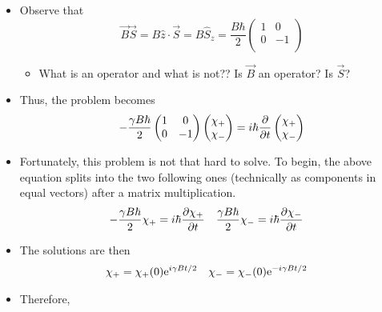 \documentclass[../notes.tex]{subfiles}
\begin{document}
\begin{itemize}
    \item Observe that
    \begin{equation*}
        \vec{B}\vec{S} = B\hat{z}\cdot\vec{S}
        = B\hat{S}_z
        = \frac{B\hbar}{2}
        \begin{pmatrix}
            1 & 0\\
            0 & -1\\
        \end{pmatrix}
    \end{equation*}
    \begin{itemize}
        \item What is an operator and what is not?? Is $\vec{B}$ an operator? Is $\vec{S}$?
    \end{itemize}
    \pagebreak
    \item Thus, the problem becomes
    \begin{equation*}
        -\frac{\gamma B\hbar}{2}
        \begin{pmatrix}
            1 & 0\\
            0 & -1\\
        \end{pmatrix}
        \begin{pmatrix}
            \chi_+\\
            \chi_-\\
        \end{pmatrix}
        = i\hbar\pdv{t}
        \begin{pmatrix}
            \chi_+\\
            \chi_-\\
        \end{pmatrix}
    \end{equation*}
    \item Fortunately, this problem is not that hard to solve. To begin, the above equation splits into the two following ones (technically as components in equal vectors) after a matrix multiplication.
    \begin{align*}
        -\frac{\gamma B\hbar}{2}\chi_+ &= i\hbar\pdv{\chi_+}{t}&
        \frac{\gamma B\hbar}{2}\chi_- &= i\hbar\pdv{\chi_-}{t}
    \end{align*}
    \item The solutions are then
    \begin{align*}
        \chi_+ &= \chi_+(0)\e[i\gamma Bt/2]&
        \chi_- &= \chi_-(0)\e[-i\gamma Bt/2]
    \end{align*}
    \item Therefore,

\end{itemize}
\end{document}

